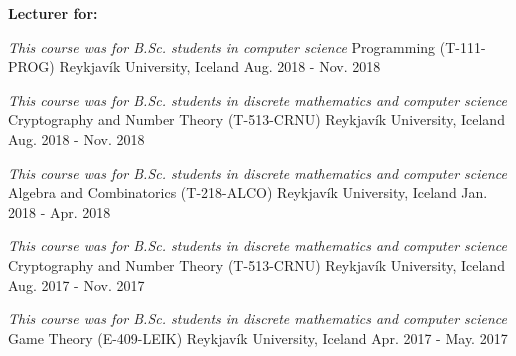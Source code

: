 


\begin{cventries}

\begin{flushleft}
\textbf{Lecturer for:}
\end{flushleft}


\cventrypresentation
  {\textit{This course was for B.Sc. students in computer science}} %
  {Programming (T-111-PROG)} %
  {Reykjavík University, Iceland} %
  {Aug. 2018 - Nov. 2018} %

\cventrypresentation
  {\textit{This course was for B.Sc. students in discrete mathematics and computer science}} %
  {Cryptography and Number Theory (T-513-CRNU)} %
  {Reykjavík University, Iceland} %
  {Aug. 2018 - Nov. 2018} %

\cventrypresentation
  {\textit{This course was for B.Sc. students in discrete mathematics and computer science}} %
  {Algebra and Combinatorics (T-218-ALCO)} %
  {Reykjavík University, Iceland} %
  {Jan. 2018 - Apr. 2018} %


\cventrypresentation
  {\textit{This course was for B.Sc. students in discrete mathematics and computer science}} %
  {Cryptography and Number Theory (T-513-CRNU)} %
  {Reykjavík University, Iceland} %
  {Aug. 2017 - Nov. 2017} %


\cventrypresentation
  {\textit{This course was for B.Sc. students in discrete mathematics and computer science}} %
  {Game Theory (E-409-LEIK)} %
  {Reykjavík University, Iceland} %
  {Apr. 2017 - May. 2017} %


\end{cventries}
